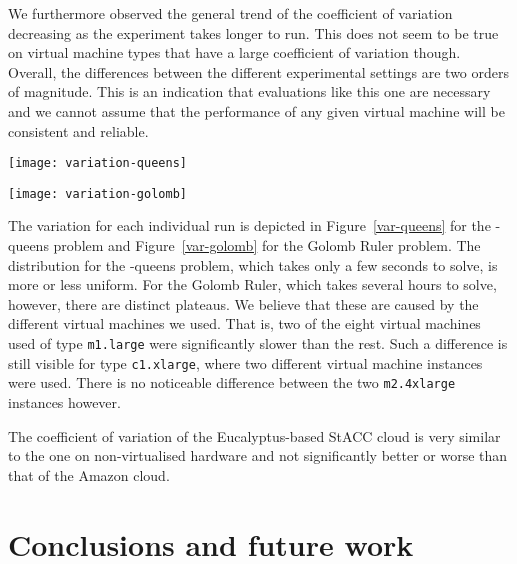 \documentclass{llncs}
\begin{document}
We furthermore observed the general trend of the coefficient of variation
decreasing as the experiment takes longer to run. This does not seem to be true
on virtual machine types that have a large coefficient of variation though.
Overall, the differences between the different experimental settings are two
orders of magnitude. This is an indication that evaluations like this one are
necessary and we cannot assume that the performance of any given virtual machine
will be consistent and reliable.

\begin{figure*}
\texttt{[image: variation-queens]}
\caption{Relative deviation from the median CPU time for the -queens
problem for each run. 1 is the median value, 2 means that the run took twice as
long as the median and 0 means that it took no time.}
\label{var-queens}
\end{figure*}

\begin{figure*}
\texttt{[image: variation-golomb]}
\caption{Relative deviation from the median CPU time for the Golomb Ruler
problem for each run.}
\label{var-golomb}
\end{figure*}

The variation for each individual run is depicted in Figure~\ref{var-queens} for
the -queens problem and Figure~\ref{var-golomb} for the Golomb Ruler problem.
The distribution for the -queens problem, which takes only a few seconds to
solve, is more or less uniform. For the Golomb Ruler, which takes several hours
to solve, however, there are distinct plateaus. We believe that these are caused
by the different virtual machines we used. That is, two of the eight virtual
machines used of type \texttt{m1.large} were significantly slower than the rest.
Such a difference is still visible for type \texttt{c1.xlarge}, where two
different virtual machine instances were used. There is no noticeable difference
between the two \texttt{m2.4xlarge} instances however.

The coefficient of variation of the Eucalyptus-based StACC cloud is very similar
to the one on non-virtualised hardware and not significantly better or worse
than that of the Amazon cloud.

\section{Conclusions and future work}
\end{document}
